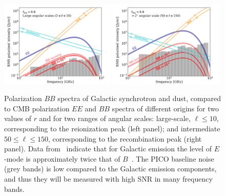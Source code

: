 \documentclass[PICOReport.tex]{subfiles}
\begin{document}
\begin{figure}[ht]
\includegraphics[width=0.49\textwidth]{images/sensitivity_vs_frequency_Jan3_2019_large_scale_v2.pdf}
\includegraphics[width=0.49\textwidth]{images/sensitivity_vs_frequency_Jan3_2019_2deg_scale_v2.pdf}
\vspace{-0.1in}
\caption{\captiontext
Polarization $BB$ spectra of Galactic synchrotron and dust, compared to CMB polarization $EE$ and $BB$ spectra of different origins for two values of $r$ and for two ranges of angular scales: large-scale, $\ell \leq 10$, corresponding to the reionization peak (left panel); and intermediate $50 \leq \ell \leq 150$, corresponding to the recombination peak (right panel). 
Data from \planck\ indicate that for Galactic emission the level of $E$-mode is approximately twice that of $B$~\cite{planckEB}.
The PICO baseline noise (grey bands) is low compared to the Galactic emission components, and thus they will be measured with high \ac{SNR} in many frequency bands.
\label{fig:pico-channels-and-fg} }
\vspace{-0.05in}
\end{figure}
\end{document}
